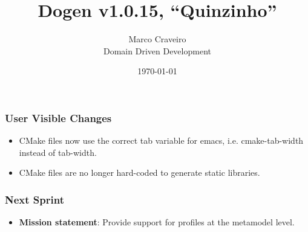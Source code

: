 \documentclass{beamer}
\title{Dogen v1.0.15, \enquote{Quinzinho}}
\author{Marco Craveiro \\
  Domain Driven Development
}
\date{\today}
\begin{document}
\begin{frame}
\titlepage
\end{frame}

\begin{frame}
\frametitle{User Visible Changes}

\begin{itemize}

\item CMake files now use the correct tab variable for emacs,
  i.e. cmake-tab-width instead of tab-width.
\item CMake files are no longer hard-coded to generate static
  libraries.

\end{itemize}

\end{frame}

\begin{frame}
\frametitle{Next Sprint}

\begin{itemize}
\item \textbf{Mission statement}: Provide support for profiles at the
  metamodel level.
\end{itemize}

\end{frame}
\end{document}
